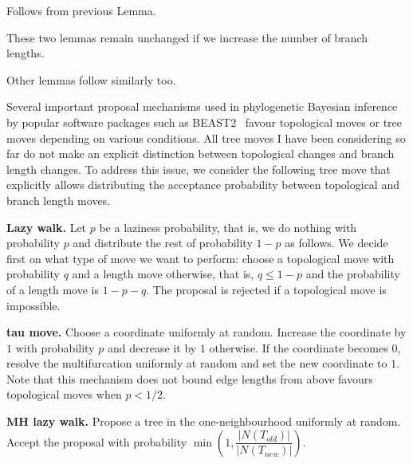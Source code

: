 \documentclass{amsart}
\begin{document}
\proof
Follows from previous Lemma. 
\endproof

These two lemmas remain unchanged if we increase the number of branch lengths. 

Other lemmas follow similarly too. 

Several important proposal mechanisms used in phylogenetic Bayesian inference by 
popular software packages such as BEAST2~\cite{beast2} favour topological moves
or tree moves depending on various conditions. All tree moves I have been 
considering so far do not make an explicit distinction between topological 
changes and branch length changes. To address this issue, we consider the
following tree move that explicitly allows distributing the acceptance 
probability between topological and branch length moves. 

{\bf Lazy walk.} Let $p$ be a laziness probability, that is, we do nothing 
with probability $p$ and distribute the rest of probability $1-p$ as follows. 
We decide first on what type of move we want to perform: choose a topological 
move with probability $q$ and a length move otherwise, that is, $q \leq 1-p$
and the probability of a length move is $1-p-q$. The proposal is rejected if
a topological move is impossible. 

{\bf tau move.} Choose a coordinate uniformly at random. Increase the
coordinate by $1$ with probability $p$ and decrease it by $1$ otherwise.
If the coordinate becomes $0$, resolve the multifurcation uniformly at
random and set the new coordinate to $1$. Note that this mechanism 
does not bound edge lengths from above favours topological moves when 
$p<1/2$. 

{\bf MH lazy walk.} Propose a tree in the one-neighbourhood uniformly at random. 
Accept the proposal with probability 
$\min(1, \dfrac{|N(T_{old})|}{|N(T_{new})|})$. 



\end{document}
